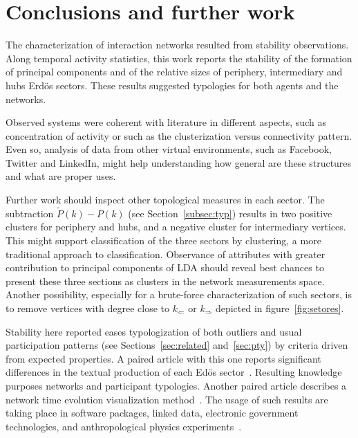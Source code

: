 \documentclass[%
 aip,
 jmp,%
 amsmath,amssymb,
 reprint,%
]{revtex4-1}
\begin{document}
\section{Conclusions and further work}\label{sec:conc}
The characterization of interaction networks resulted from stability observations. Along temporal activity statistics, this work reports the stability of the formation of principal components and of the relative sizes of periphery, intermediary and hubs Erd\"os sectors. These results suggested typologies for both agents and the networks.

Observed systems were coherent with literature in different aspects, such as concentration of activity or such as the clusterization versus connectivity pattern.
Even so, analysis of data from other virtual environments, such as Facebook, Twitter and LinkedIn, might help understanding how general are these structures and what are proper uses.

Further work should inspect other topological measures in each sector.
The subtraction $\widetilde{P}(k)-P(k)$ (see Section~\ref{subsec:typ}) results in two positive clusters for periphery and hubs, and a negative cluster for intermediary vertices. This might support classification of the three sectors by clustering, a more traditional approach to classification.
Observance of attributes with greater contribution to principal components of LDA should reveal best chances to present these three sections as clusters in the network measurements space. 
Another possibility, especially for a brute-force characterization of such sectors, is to remove vertices with degree close to $k_\Leftarrow$ or $k_\Rightarrow$ depicted in figure~\ref{fig:setores}.

Stability here reported eases typologization of both outliers and usual participation patterns (see Sections~\ref{sec:related} and~\ref{sec:pty}) by criteria driven from expected properties.
A paired article with this one reports significant differences in the textual production of each Ed\"os sector~\cite{rcText}. Resulting knowledge purposes networks and participant typologies.
Another paired article describes a network time evolution visualization method~\cite{versinus}.
The usage of such results are taking place in software packages, linked data, electronic government technologies, and anthropological physics experiments~\cite{gmanePack,ops,opa,ensaio,anPhy}.
\end{document}
